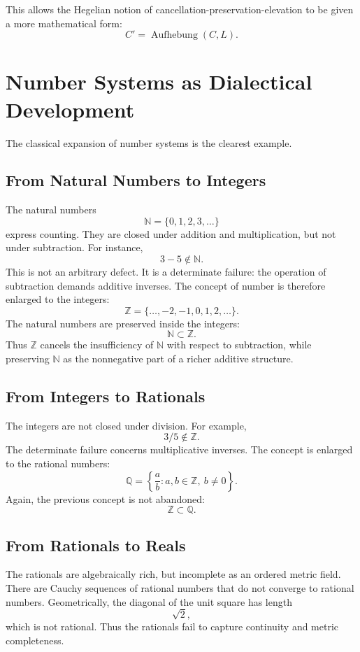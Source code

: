 \documentclass[11pt]{article}
\begin{document}
This allows the Hegelian notion of cancellation-preservation-elevation to be given a more mathematical form:
\[
C' = \operatorname{Aufhebung}(C,L).
\]

\section{Number Systems as Dialectical Development}

The classical expansion of number systems is the clearest example.

\subsection{From Natural Numbers to Integers}

The natural numbers
\[
\mathbb{N} = \{0,1,2,3,\dots\}
\]
express counting. They are closed under addition and multiplication, but not under subtraction. For instance,
\[
3-5 \notin \mathbb{N}.
\]
This is not an arbitrary defect. It is a determinate failure: the operation of subtraction demands additive inverses. The concept of number is therefore enlarged to the integers:
\[
\mathbb{Z} = \{\dots,-2,-1,0,1,2,\dots\}.
\]
The natural numbers are preserved inside the integers:
\[
\mathbb{N} \subset \mathbb{Z}.
\]
Thus $\mathbb{Z}$ cancels the insufficiency of $\mathbb{N}$ with respect to subtraction, while preserving $\mathbb{N}$ as the nonnegative part of a richer additive structure.

\subsection{From Integers to Rationals}

The integers are not closed under division. For example,
\[
3/5 \notin \mathbb{Z}.
\]
The determinate failure concerns multiplicative inverses. The concept is enlarged to the rational numbers:
\[
\mathbb{Q} = \left\{\frac{a}{b} : a,b \in \mathbb{Z},\ b\neq 0\right\}.
\]
Again, the previous concept is not abandoned:
\[
\mathbb{Z} \subset \mathbb{Q}.
\]

\subsection{From Rationals to Reals}

The rationals are algebraically rich, but incomplete as an ordered metric field. There are Cauchy sequences of rational numbers that do not converge to rational numbers. Geometrically, the diagonal of the unit square has length
\[
\sqrt{2},
\]
which is not rational. Thus the rationals fail to capture continuity and metric completeness.
\end{document}
